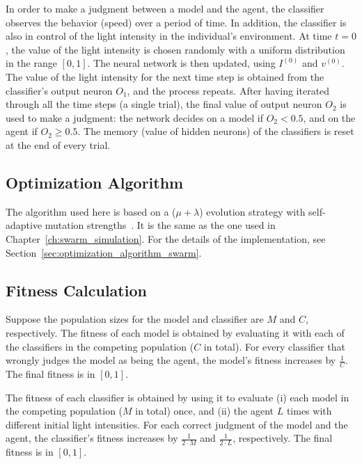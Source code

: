 In order to make a judgment between a model and the agent, the classifier observes the behavior (speed) over a period of time. In addition, the classifier is also in control of the light intensity in the individual's environment. At time $t=0$, the value of the light intensity is chosen randomly with a uniform distribution in the range $\left[0,1\right]$. The neural network is then updated, using $I^{\left(0\right)}$ and $v^{\left(0\right)}$. The value of the light intensity for the next time step is obtained from the classifier's output neuron $O_1$, and the process repeats. After having iterated through all the time steps (a single trial), the final value of output neuron $O_2$ is used to make a judgment: the network decides on a model if $O_2<0.5$, and on the agent if $O_2\geq0.5$. The memory (value of hidden neurons) of the classifiers is reset at the end of every trial.

\subsection{Optimization Algorithm}\label{sec:optimization_algorithm_interaction}

The algorithm used here is based on a ($\mu+\lambda$) evolution strategy with self-adaptive mutation strengths~\cite{Beyer2002, Eiben2003}. It is the same as the one used in  Chapter~\ref{ch:swarm_simulation}. For the details of the implementation, see Section~\ref{sec:optimization_algorithm_swarm}.

\subsection{Fitness Calculation}\label{sec:fitness_calculation_interaction}

Suppose the population sizes for the model and classifier are $M$ and $C$, respectively. The fitness of each model is obtained by evaluating it with each of the classifiers in the competing population ($C$ in total). For every classifier that wrongly judges the model as being the agent, the model's fitness increases by $\frac{1}{C}$. The final fitness is in $[0,1]$.

The fitness of each classifier is obtained by using it to evaluate (i) each model in the competing population ($M$ in total) once, and (ii) the agent $L$ times with different initial light intensities. For each correct judgment of the model and the agent, the classifier's fitness increases by $\frac{1}{2 \cdot M}$ and $\frac{1}{2 \cdot L}$, respectively. The final fitness is in $[0,1]$.

